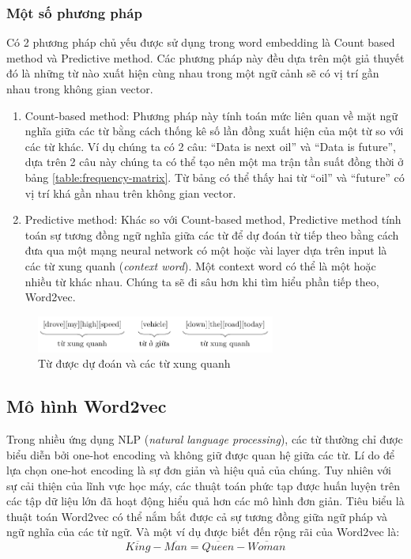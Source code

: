 \subsubsection{Một số phương pháp}
Có 2 phương pháp chủ yếu được sử dụng trong word embedding là Count based method và Predictive method. Các phương pháp này đều dựa trên một giả thuyết đó là những từ nào xuất hiện cùng nhau trong một ngữ cảnh sẽ có vị trí gần nhau trong không gian vector. \cite{webpage12}
\begin{enumerate}
    \item Count-based method: Phương pháp này tính toán mức liên quan về mặt ngữ nghĩa giữa các từ bằng cách thống kê số lần đồng xuất hiện của một từ so với các từ khác. Ví dụ chúng ta có 2 câu: ``Data is next oil'' và ``Data is future'', dựa trên 2 câu này chúng ta có thể tạo nên một ma trận tần suất đồng thời ở bảng \ref{table:frequency-matrix}. Từ bảng có thể thấy hai từ ``oil'' và ``future'' có vị trí khá gần nhau trên không gian vector.
    \item Predictive method: Khác so với Count-based method, Predictive method tính toán sự tương đồng ngữ nghĩa giữa các từ để dự đoán từ tiếp theo bằng cách đưa qua một mạng neural network có một hoặc vài layer dựa trên input là các từ xung quanh (\textit{context word}). Một context word có thể là một hoặc nhiều từ khác nhau. Chúng ta sẽ đi sâu hơn khi tìm hiểu phần tiếp theo, Word2vec.
\end{enumerate}

\begin{figure}[htb]
    \centering
    \includegraphics[width=0.7\textwidth]{tikz_image/predictive_method.pdf}
    \caption{Từ được dự đoán và các từ xung quanh}
    \label{figure:predictive-method}
\end{figure}

\subsection{Mô hình Word2vec}
Trong nhiều ứng dụng NLP (\textit{natural language processing}), các từ thường chỉ được biểu diễn bởi one-hot encoding và không giữ được quan hệ giữa các từ. Lí do để lựa chọn one-hot encoding là sự đơn giản và hiệu quả của chúng. \cite{Aggarwal2022-xj} Tuy nhiên với sự cải thiện của lĩnh vực học máy, các thuật toán phức tạp được huấn luyện trên các tập dữ liệu lớn đã hoạt động hiểu quả hơn các mô hình đơn giản. Tiêu biểu là thuật toán Word2vec có thể nắm bắt được cả sự tương đồng giữa ngữ pháp và ngữ nghĩa của các từ ngữ. Và một ví dụ được biết đến rộng rãi của Word2vec là:
\[
    \overline{King}-\overline{Man}=\overline{Queen}-\overline{Woman}
\]

